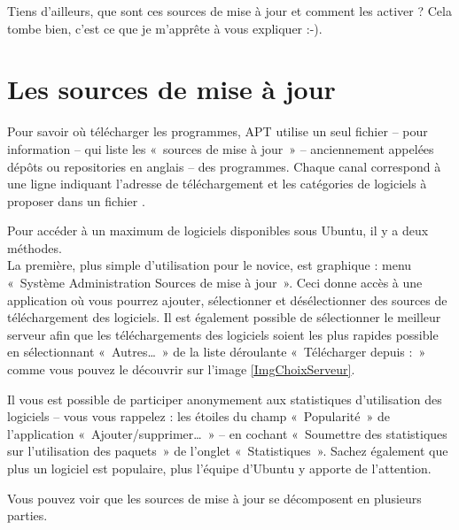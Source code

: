 {\begin{nota}
Tiens d'ailleurs, que sont ces sources de mise à jour et comment les activer ? Cela tombe bien, c'est ce que je m'apprête à vous expliquer :-).
\end{nota}
\section{Les sources de mise à jour}
\label{RefSourceMAJ}
Pour savoir où télécharger les programmes, APT utilise un seul fichier --  pour information -- qui liste les «~sources de mise à jour~» -- anciennement appelées dépôts ou repositories en anglais -- des programmes. Chaque canal correspond à une ligne indiquant l'adresse de téléchargement et les catégories de logiciels à proposer dans un fichier .\par
Pour accéder à un maximum de logiciels disponibles sous Ubuntu, il y a deux méthodes.\\
La première, plus simple d'utilisation pour le novice, est graphique : menu «~Système \FlecheDroite Administration \FlecheDroite Sources de mise à jour~». Ceci donne accès à une application où vous pourrez ajouter, sélectionner et désélectionner des sources de téléchargement des logiciels. Il est également possible de sélectionner le meilleur serveur afin que les téléchargements des logiciels soient les plus rapides possible en sélectionnant «~Autres\ldots{}~» de la liste déroulante «~Télécharger depuis :~» comme vous pouvez le découvrir sur l'image \ref{ImgChoixServeur}.\par
{}
\begin{nota}
Il vous est possible de participer anonymement aux statistiques d'utilisation des logiciels -- vous vous rappelez : les étoiles du champ «~Popularité~» de l'application «~Ajouter/supprimer\dots{}~» -- en cochant «~Soumettre des statistiques sur l'utilisation des paquets~» de l'onglet «~Statistiques~». Sachez également que plus un logiciel est populaire, plus l'équipe d'Ubuntu y apporte de l'attention.
\end{nota}
Vous pouvez voir que les sources de mise à jour se décomposent en plusieurs parties.
}
